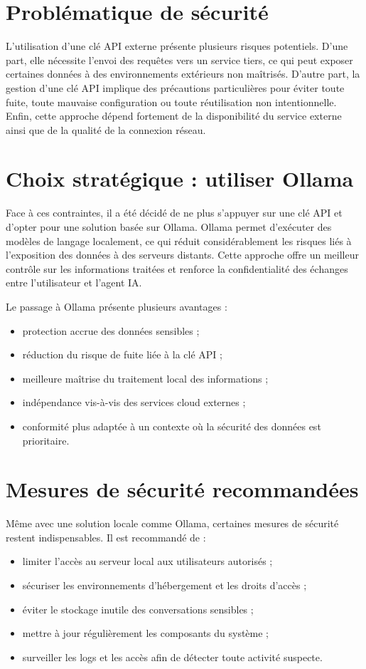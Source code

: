 \documentclass[11pt,a4paper]{report}
\begin{document}
\section{Problématique de sécurité}
L’utilisation d’une clé API externe présente plusieurs risques potentiels. D’une part, elle nécessite l’envoi des requêtes vers un service tiers, ce qui peut exposer certaines données à des environnements extérieurs non maîtrisés. D’autre part, la gestion d’une clé API implique des précautions particulières pour éviter toute fuite, toute mauvaise configuration ou toute réutilisation non intentionnelle. Enfin, cette approche dépend fortement de la disponibilité du service externe ainsi que de la qualité de la connexion réseau.

\section{Choix stratégique : utiliser Ollama}
Face à ces contraintes, il a été décidé de ne plus s’appuyer sur une clé API et d’opter pour une solution basée sur Ollama. Ollama permet d’exécuter des modèles de langage localement, ce qui réduit considérablement les risques liés à l’exposition des données à des serveurs distants. Cette approche offre un meilleur contrôle sur les informations traitées et renforce la confidentialité des échanges entre l’utilisateur et l’agent IA.

Le passage à Ollama présente plusieurs avantages :
\begin{itemize}[leftmargin=1.5em]
    \item protection accrue des données sensibles ;
    \item réduction du risque de fuite liée à la clé API ;
    \item meilleure maîtrise du traitement local des informations ;
    \item indépendance vis-à-vis des services cloud externes ;
    \item conformité plus adaptée à un contexte où la sécurité des données est prioritaire.
\end{itemize}

\section{Mesures de sécurité recommandées}
Même avec une solution locale comme Ollama, certaines mesures de sécurité restent indispensables. Il est recommandé de :
\begin{itemize}[leftmargin=1.5em]
    \item limiter l’accès au serveur local aux utilisateurs autorisés ;
    \item sécuriser les environnements d’hébergement et les droits d’accès ;
    \item éviter le stockage inutile des conversations sensibles ;
    \item mettre à jour régulièrement les composants du système ;
    \item surveiller les logs et les accès afin de détecter toute activité suspecte.
\end{itemize}
\end{document}

